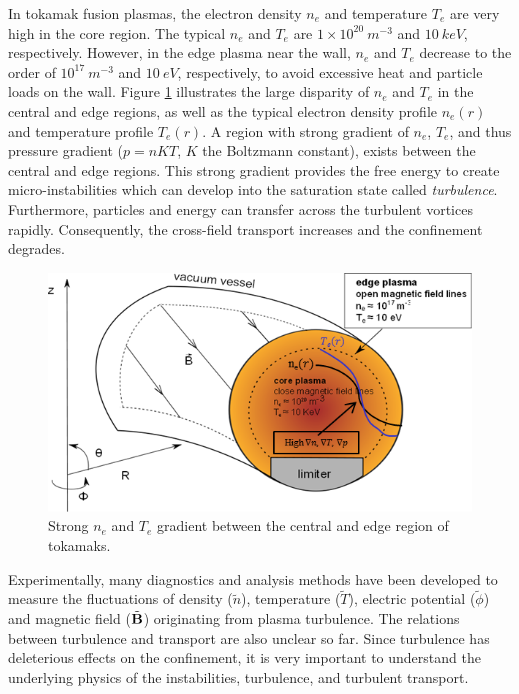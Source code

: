 In tokamak fusion plasmas, the electron density $n_e$ and temperature $T_e$ are very high in the core region. The typical $n_e$ and $T_e$ are $1\times 10^{20}\ m^{-3}$ and $10\ keV$, respectively. However, in the edge plasma near the wall, $n_e$ and $T_e$ decrease to the order of $10^{17}\ m^{-3}$ and $10\ eV$, respectively, to avoid excessive heat and particle loads on the wall. Figure \ref{fig:gradient} illustrates the large disparity of $n_e$ and $T_e$ in the central and edge regions, as well as the typical electron density profile $n_e(r)$ and temperature profile $T_e(r)$. A region with strong gradient of $n_e$, $T_e$, and thus pressure gradient ($p = nKT$, $K$ the Boltzmann constant), exists between the central and edge regions. This strong gradient provides the free energy to create micro-instabilities which can develop into the saturation state called \emph{turbulence}. Furthermore, particles and energy can transfer across the turbulent vortices rapidly. Consequently, the cross-field transport increases and the confinement degrades.


\begin{figure}[h]
\begin{centering}
\includegraphics[scale=1]{gradient.png}
\par\end{centering}
\caption[Gradient from core to edge]{Strong $n_e$ and $T_e$ gradient between the central and edge region of tokamaks.}
\label{fig:gradient}
\end{figure}


Experimentally, many diagnostics and analysis methods have been developed to measure the fluctuations of density ($\tilde{n}$), temperature ($\tilde{T}$), electric potential ($\tilde{\phi}$) and magnetic field ($\tilde{\boldsymbol{\mathrm{B}}}$) originating from plasma turbulence. The relations between turbulence and transport are also unclear so far. Since turbulence has deleterious effects on the confinement, it is very important to understand the underlying physics of the instabilities, turbulence, and turbulent transport.


